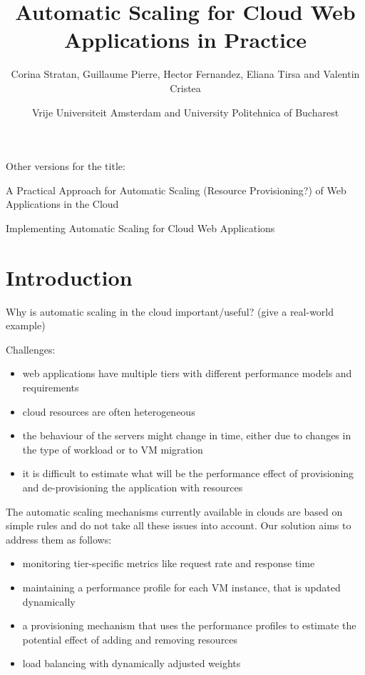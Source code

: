 \documentclass[10pt,twocolumn]{article}
\begin{document}
\begin{multicols}{2}
\title{Automatic Scaling for Cloud Web Applications in Practice}
\author{Corina Stratan, Guillaume Pierre, Hector Fernandez, Eliana Tirsa and Valentin Cristea} 
\date{Vrije Universiteit Amsterdam and University Politehnica of Bucharest}
\maketitle
\end{multicols}


Other versions for the title:

A Practical Approach for Automatic Scaling (Resource Provisioning?) of
Web Applications in the Cloud

Implementing Automatic Scaling for Cloud Web Applications


\section*{Introduction}

Why is automatic scaling in the cloud important/useful? (give a real-world example)

Challenges:
\begin{itemize}
\item web applications have multiple tiers with different performance
models and requirements
\item cloud resources are often heterogeneous
\item the behaviour of the servers might change in time, either due to
changes in the type of workload or to VM migration
\item it is difficult to estimate what will be the performance effect
of provisioning and de-provisioning the application with resources
\end{itemize}


The automatic scaling mechanisms currently available in clouds are based
on simple rules and do not take all these issues into account. Our solution
aims to address them as follows:

\begin{itemize}
\item monitoring tier-specific metrics like request rate and response time
\item maintaining a performance profile for each VM instance, that is updated
dynamically
\item a provisioning mechanism that uses the performance profiles to estimate
the potential effect of adding and removing resources
\item load balancing with dynamically adjusted weights
\end{itemize}
\end{document}
